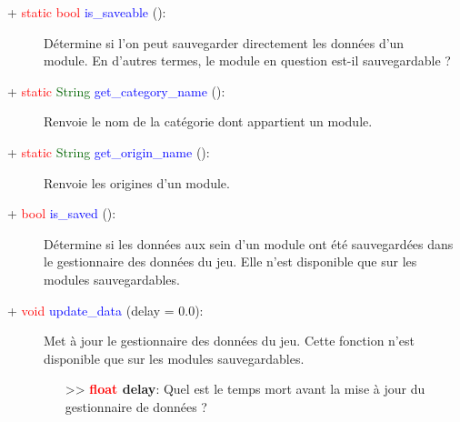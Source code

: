 \documentclass[a4paper, 11pt]{article}
\begin{document}
	\begin{description}
		\item [+ \textcolor{red}{static} \textcolor{red}{bool} \textcolor{blue}{is\_saveable} ():] Détermine
		si l'on peut sauvegarder directement les données d'un \\module. En d'autres termes, le module en
		question est-il sauvegardable ?\\
	\end{description}
	\begin{description}
		\item [+ \textcolor{red}{static} \textcolor{darkgreen}{String} \textcolor{blue}{get\_category\_name} 
		():] Renvoie le nom de la catégorie dont appartient un module.\\
	\end{description}
	\begin{description}
		\item [+ \textcolor{red}{static} \textcolor{darkgreen}{String} \textcolor{blue}{get\_origin\_name} 
		():] Renvoie les origines d'un module.\\
	\end{description}
	\begin{description}
		\item [+ \textcolor{red}{bool} \textcolor{blue}{is\_saved} ():] Détermine si les données aux sein 
		d'un module ont été sauvegardées dans le gestionnaire des données du jeu. Elle n'est disponible que 
		sur les modules sauvegardables.\\
	\end{description}
	\begin{description}
		\item [+ \textcolor{red}{void} \textcolor{blue}{update\_data} (delay = 0.0):] Met à jour le
		gestionnaire des données du jeu. Cette fonction n'est disponible que sur les modules sauvegardables.
		\begin{itemize}
			\item [>> \textbf{\textcolor{red}{float} delay}:] Quel est le temps mort avant la mise à jour du 
			gestionnaire de données ?\\
		\end{itemize}
	\end{description}
\end{document}
